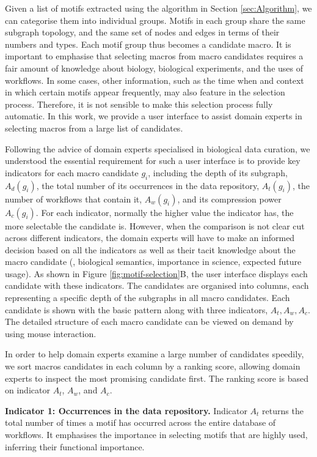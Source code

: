 Given a list of motifs extracted using the algorithm in Section \ref{sec:Algorithm}, we can categorise them into individual groups.
Motifs in each group share the same subgraph topology, and the same set of nodes and edges in terms of their numbers and types.
Each motif group thus becomes a candidate macro.
It is important to emphasise that selecting macros from macro candidates requires a fair amount of knowledge about biology, biological experiments, and the uses of workflows.
In some cases, other information, such as the time when and context in which certain motifs appear frequently, may also feature in the selection process.
Therefore, it is not sensible to make this selection process fully automatic.
In this work, we provide a user interface to assist domain experts in selecting macros from a large list of candidates.

Following the advice of domain experts specialised in biological data curation, we understood the essential requirement for such a user interface is to provide key indicators for each macro candidate $g_i$, including the depth of its subgraph, $A_d(g_i)$, the total number of its occurrences in the data repository, $A_t(g_i)$, the number of workflows that contain it, $A_w(g_i)$, and its compression power $A_c(g_i)$.
For each indicator, normally the higher value the indicator has, the more selectable the candidate is.
However, when the comparison is not clear cut across different indicators, the domain experts will have to make an informed decision based on all the indicators as well as their tacit knowledge about the macro candidate (\eg, biological semantics, importance in science, expected future usage).
As shown in Figure \ref{fig:motif-selection}B, the user interface displays each candidate with these indicators.
The candidates are organised into columns, each representing a specific depth of the subgraphs in all macro candidates. 
Each candidate is shown with the basic pattern along with three indicators, $A_t, A_w, A_c$.
The detailed structure of each macro candidate can be viewed on demand by using mouse interaction.

In order to help domain experts examine a large number of candidates speedily, we sort macros candidates in each column by a ranking score, allowing domain experts to inspect the most promising candidate first.
The ranking score is based on indicator $A_t$, $A_w$, and $A_c$.

\noindent \textbf{Indicator 1: Occurrences in the data repository.} Indicator $A_t$ returns the total number of times a motif has occurred across the entire database of workflows.
It emphasises the importance in selecting motifs that are highly used, inferring their functional importance. 

